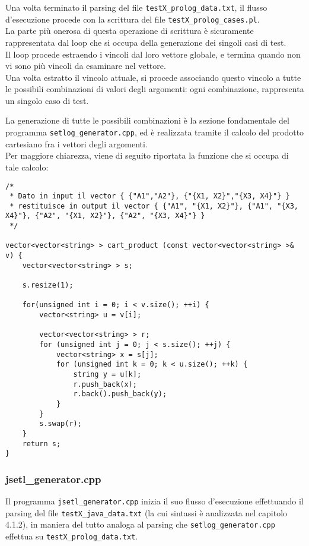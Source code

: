 Una volta terminato il parsing del file \texttt{testX\_prolog\_data.txt}, il flusso d'esecuzione procede con la scrittura del file \texttt{testX\_prolog\_cases.pl}.\\

La parte più onerosa di questa operazione di scrittura è sicuramente rappresentata dal loop che si occupa della generazione dei singoli casi di test.\\
Il loop procede estraendo i vincoli dal loro vettore globale, e termina quando non vi sono più vincoli da esaminare nel vettore.\\
Una volta estratto il vincolo attuale, si procede associando questo vincolo a tutte le possibili combinazioni di valori degli argomenti: ogni combinazione, rappresenta un singolo caso di test.\\

\clearpage

La generazione di tutte le possibili combinazioni è la sezione fondamentale del programma \texttt{setlog\_generator.cpp}, ed è realizzata tramite il calcolo del prodotto cartesiano fra i vettori degli argomenti.\\
Per maggiore chiarezza, viene di seguito riportata la funzione che si occupa di tale calcolo:\\

\begin{lstlisting}
/* 
 * Dato in input il vector { {"A1","A2"}, {"{X1, X2}","{X3, X4}"} } 
 * restituisce in output il vector { {"A1", "{X1, X2}"}, {"A1", "{X3, X4}"}, {"A2", "{X1, X2}"}, {"A2", "{X3, X4}"} }
 */

vector<vector<string> > cart_product (const vector<vector<string> >& v) {
    vector<vector<string> > s;

    s.resize(1);

    for(unsigned int i = 0; i < v.size(); ++i) {
        vector<string> u = v[i];

        vector<vector<string> > r;
        for (unsigned int j = 0; j < s.size(); ++j) {
            vector<string> x = s[j];
            for (unsigned int k = 0; k < u.size(); ++k) {
                string y = u[k];
                r.push_back(x);
                r.back().push_back(y);
            }
        }
        s.swap(r);
    }
    return s;
}
\end{lstlisting}

\subsubsection{jsetl\_generator.cpp}
Il programma \texttt{jsetl\_generator.cpp} inizia il suo flusso d'esecuzione effettuando il parsing del file \texttt{testX\_java\_data.txt} (la cui sintassi è analizzata nel capitolo 4.1.2), in maniera del tutto analoga al parsing che \texttt{setlog\_generator.cpp} effettua su \texttt{testX\_prolog\_data.txt}.\\

